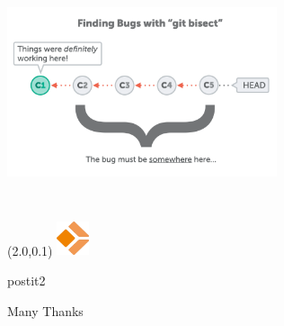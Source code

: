 \documentclass[11pt,xcolor={dvipsnames}]{beamer} %
\newcommand{\MyLogo}{%
\begin{textblock}{14}(2.0,0.1)
 \includegraphics[height=1cm, angle=0]{logo}
\end{textblock}
}
\begin{document}
\begin{frame}
	\includegraphics[height=250px,width=300px]{bisect-overview.png}
\end{frame}
\begin{frame}
\transboxin
\MyLogo
\vspace{1.0cm}
\begin{beamercolorbox}[sep=1.0cm, center, shadow=false, rounded=true]{postit2}
\begin{Huge}Many Thanks\end{Huge}
\end{beamercolorbox}
\end{frame}
\end{document}
